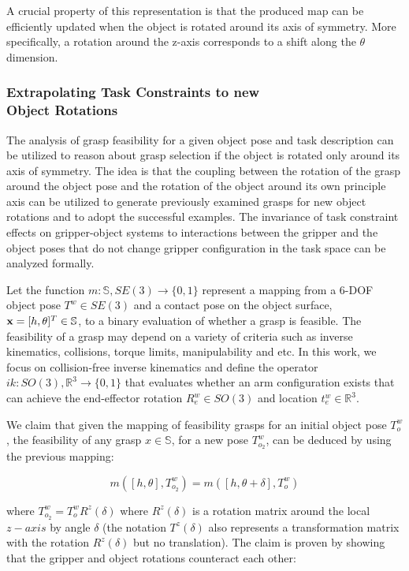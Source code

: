 \documentclass{aamas2015}
\begin{document}
A crucial property of this representation is that the produced map can
be efficiently updated when the object is rotated around its axis of symmetry. More specifically, a rotation around the z-axis corresponds to a shift along the $\theta$ dimension. 

\subsubsection{Extrapolating Task Constraints to new \\Object Rotations}
The analysis of grasp feasibility for a given object pose and task description can be utilized to reason
about grasp selection if the object is rotated only around its axis of symmetry. The idea is that the 
coupling between the rotation of the grasp around the object pose and the rotation of the object around
its own principle axis can be utilized to generate previously examined grasps for new object rotations
and to adopt the successful examples. The invariance of task constraint effects on gripper-object
systems to interactions between the gripper and the object poses that do not change gripper configuration
in the task space can be analyzed formally. 

Let the function $m: \mathbb{S}, SE(3) \rightarrow \{0,1\}$ represent a mapping from a 6-DOF object pose $T^w \in SE(3)$ and a contact pose on the object surface, $\textbf{x} = [h, \theta]^T \in \mathbb{S}$, to a binary evaluation of whether a grasp is feasible. The feasibility of a grasp may depend on a variety
of criteria such as inverse kinematics, collisions, torque limits, manipulability and etc. In this work,
we focus on collision-free inverse kinematics and define the operator $ik: SO(3), \mathbb{R}^3 \rightarrow \{0,1\}$
that evaluates whether an arm configuration exists that can achieve the end-effector rotation $R^w_e \in SO(3)$ and location $t^w_e \in \mathbb{R}^3$. 

We claim that given the mapping of feasibility grasps for an initial object pose $T^w_o$, the feasibility of any 
grasp $x \in \mathbb{S}$, for a new pose $T^w_{o_2}$, can be deduced by using the previous mapping:

\begin{equation}
  m([h,\theta],T^w_{o_2}) = m([h,\theta+\delta], T^w_o)
\end{equation}

\noindent where $T^w_{o_2} = T^w_o R^z(\delta)$ where $R^z(\delta)$ is a rotation matrix around the
local $z-axis$ by angle $\delta$ (the notation $T^z(\delta)$ also represents a
transformation matrix with the rotation $R^z(\delta)$ but no translation). The claim is proven
by showing that the gripper and object rotations counteract each other:
\end{document}
